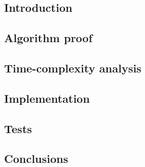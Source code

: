 \documentclass[a4paper,10pt,notitlepage]{article}
\begin{document}
\subsection{Introduction}

\subsection{Algorithm proof}

\subsection{Time-complexity analysis}

\subsection{Implementation}

\subsection{Tests}

\subsection{Conclusions}
\end{document}
